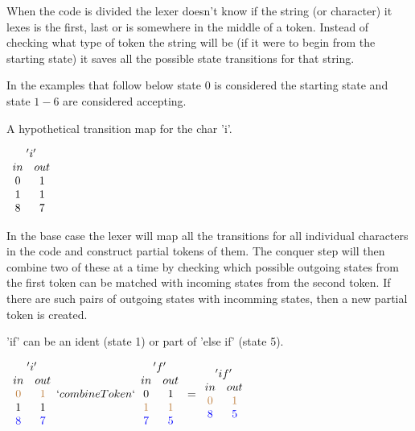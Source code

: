 When the code is divided the lexer doesn't know if the string (or character) it
lexes is the first, last or is somewhere in the middle of a token. Instead of
checking what type of token the string will be (if it were to begin from the
starting state) it saves all the possible state transitions for that string.

In the examples that follow below state 0 is considered the starting state and
state $1-6$ are considered accepting.
\begin{example}\label{transMap}
A hypothetical transition map for the char 'i'.
\begin{center}$\begin{array}{cc}
\multicolumn{2}{c}{'i'}\\
in & out\\
0 & 1\\
1 & 1\\
8 & 7\\
\end{array}$\\
\end{center}
\end{example}
In the base case the lexer will map all the transitions for all individual
characters in the code and construct partial tokens of them. The conquer step
will then combine two of these at a time by checking which possible outgoing
states from the first token can be matched with incoming states from the second
token. If there are such pairs of outgoing states with incomming states, then a
new partial token is created.
\begin{example}\label{combTok}
'if' can be an ident (state 1) or part of 'else if' (state 5).
\begin{center}$\begin{array}{cc}
\multicolumn{2}{c}{'i'}\\
in & out\\
\textcolor{brown}{0} & \textcolor{brown}{1}\\
1 & 1\\
\textcolor{blue}{8} & \textcolor{blue}{7}\\
\end{array}
`combineToken`
\begin{array}{cc}\multicolumn{2}{c}{'f'}\\
in & out\\
0 & 1\\
\textcolor{brown}{1} & \textcolor{brown}{1}\\
\textcolor{blue}{7} & \textcolor{blue}{5}\\
\end{array}
=
\begin{array}{cc}\multicolumn{2}{c}{'if'}\\
in & out\\
\textcolor{brown}{0} & \textcolor{brown}{1}\\
\textcolor{blue}{8} & \textcolor{blue}{5}\\
\end{array}$\\
\end{center}
\end{example}
